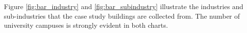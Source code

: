 Figure \ref{fig:bar_industry} and \ref{fig:bar_subindustry} illustrate the industries and sub-industries that the case study buildings are collected from. The number of university campuses is strongly evident in both charts.